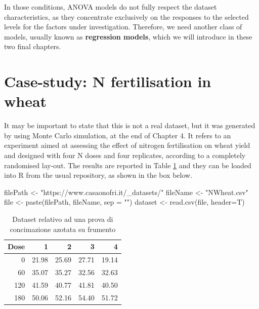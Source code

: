 \documentclass[a4paper,12pt,oneside]{book}
\newenvironment{Shaded}{\begin{snugshade}}{\end{snugshade}}
\newcommand{\StringTok}[1]{#1}
\newcommand{\OtherTok}[1]{#1}
\newcommand{\FunctionTok}[1]{#1}
\newcommand{\AttributeTok}[1]{#1}
\newcommand{\NormalTok}[1]{#1}
\begin{document}
In those conditions, ANOVA models do not fully respect the dataset characteristics, as they concentrate exclusively on the responses to the selected levels for the factors under investigation. Therefore, we need another class of models, usually known as \textbf{regression models}, which we will introduce in these two final chapters.

\hypertarget{case-study-n-fertilisation-in-wheat}{%
\section{Case-study: N fertilisation in wheat}\label{case-study-n-fertilisation-in-wheat}}

It may be important to state that this is not a real dataset, but it was generated by using Monte Carlo simulation, at the end of Chapter 4. It refers to an experiment aimed at assessing the effect of nitrogen fertilisation on wheat yield and designed with four N doses and four replicates, according to a completely randomised lay-out. The results are reported in Table \ref{tab:tabName141} and they can be loaded into R from the usual repository, as shown in the box below.

\begin{Shaded}
\begin{Highlighting}[]
\NormalTok{filePath }\OtherTok{\textless{}{-}} \StringTok{"https://www.casaonofri.it/\_datasets/"}
\NormalTok{fileName }\OtherTok{\textless{}{-}} \StringTok{"NWheat.csv"}
\NormalTok{file }\OtherTok{\textless{}{-}} \FunctionTok{paste}\NormalTok{(filePath, fileName, }\AttributeTok{sep =} \StringTok{""}\NormalTok{)}
\NormalTok{dataset }\OtherTok{\textless{}{-}} \FunctionTok{read.csv}\NormalTok{(file, }\AttributeTok{header=}\NormalTok{T)}
\end{Highlighting}
\end{Shaded}

\begin{table}

\caption{\label{tab:tabName141}Dataset relativo ad una prova di concimazione azotata su frumento}
\centering
\begin{tabular}[t]{rrrrr}
\toprule
Dose & 1 & 2 & 3 & 4\\
\midrule
0 & 21.98 & 25.69 & 27.71 & 19.14\\
60 & 35.07 & 35.27 & 32.56 & 32.63\\
120 & 41.59 & 40.77 & 41.81 & 40.50\\
180 & 50.06 & 52.16 & 54.40 & 51.72\\
\bottomrule
\end{tabular}
\end{table}
\end{document}
